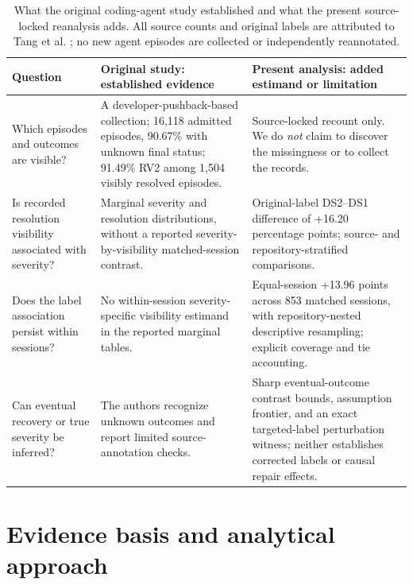 \begin{table}[htbp]
\centering\small
\caption{What the original coding-agent study established and what the present source-locked reanalysis adds. All source counts and original labels are attributed to Tang et al. \cite{ref35}; no new agent episodes are collected or independently reannotated.}
\label{tab:contributions}
\begin{tabularx}{\textwidth}{@{}p{}Y Y@{}}
\toprule
\textbf{Question} & \textbf{Original study: established evidence} & \textbf{Present analysis: added estimand or limitation}\\
\midrule
Which episodes and outcomes are visible? & A developer-pushback-based collection; 16,118 admitted episodes, 90.67\% with unknown final status; 91.49\% RV2 among 1,504 visibly resolved episodes. & Source-locked recount only. We do \emph{not} claim to discover the missingness or to collect the records.\\
Is recorded resolution visibility associated with severity? & Marginal severity and resolution distributions, without a reported severity-by-visibility matched-session contrast. & Original-label DS2--DS1 difference of +16.20 percentage points; source- and repository-stratified comparisons.\\
Does the label association persist within sessions? & No within-session severity-specific visibility estimand in the reported marginal tables. & Equal-session +13.96 points across 853 matched sessions, with repository-nested descriptive resampling; explicit coverage and tie accounting.\\
Can eventual recovery or true severity be inferred? & The authors recognize unknown outcomes and report limited source-annotation checks. & Sharp eventual-outcome contrast bounds, assumption frontier, and an exact targeted-label perturbation witness; neither establishes corrected labels or causal repair effects.\\
\bottomrule
\end{tabularx}
\end{table}

\section{Evidence basis and analytical approach}\label{sec:method}
